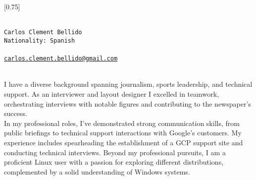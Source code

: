 \documentclass[lighthipster]{simplehipstercv}
\begin{document}
\setlength{\columnsep}{1.5cm}
[0.75]
\begin{paracol}{2}

\paracolbackgroundoptions



\footnotesize
{\setasidefontcolour
\flushright
\begin{center}
\end{center}

\begin{flushleft}
 \\[0.5em]



\texttt{Carlos Clement Bellido} \\
\vspace{0.4em}
\texttt{Nationality: Spanish}\\
\vspace{0.25em}
\\
\vspace{0.25em}
\href{mailto:carlos.clement.bellido@gmail.com}{\scriptsize \texttt{carlos.clement.bellido@gmail.com}}

\bigskip

 \\ [0.5em]
I have a diverse background spanning journalism, sports leadership, and technical support. As an interviewer and layout designer I excelled in teamwork, orchestrating interviews with notable figures and contributing to the newspaper's success.\\
\vspace{0.5em}
In my professional roles, I've demonstrated strong communication skills, from public briefings to technical support interactions with Google's customers. My experience includes spearheading the establishment of a GCP support site and conducting technical interviews. Beyond my professional pursuits, I am a proficient Linux user with a passion for exploring different distributions, complemented by a solid understanding of Windows systems.
\bigskip



 \\[0.5em]


\end{flushleft}}
\end{paracol}
\end{document}
